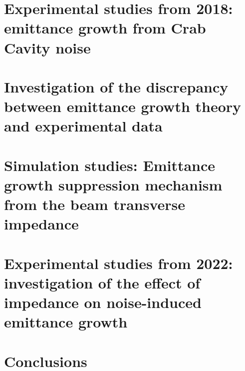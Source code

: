 \documentclass[12pt,twoside]{report} %
\begin{document}
%

\chapter{Experimental studies from 2018: emittance growth from Crab Cavity noise}\label{Ch:2018_analyisis}


%

\chapter{Investigation of the discrepancy between emittance growth theory and experimental data}\label{Ch:investigating_discrepancy}


\chapter{Simulation studies: Emittance growth suppression mechanism from the beam transverse impedance}\label{Ch:suppression_impedances}\label{Ch:suppression_impedance}


\chapter{Experimental studies from 2022: investigation of the effect of impedance on noise-induced emittance growth}\label{Ch:experimental_CC_2022}


\chapter{Conclusions}\label{Ch:conclusions}

\end{document}
